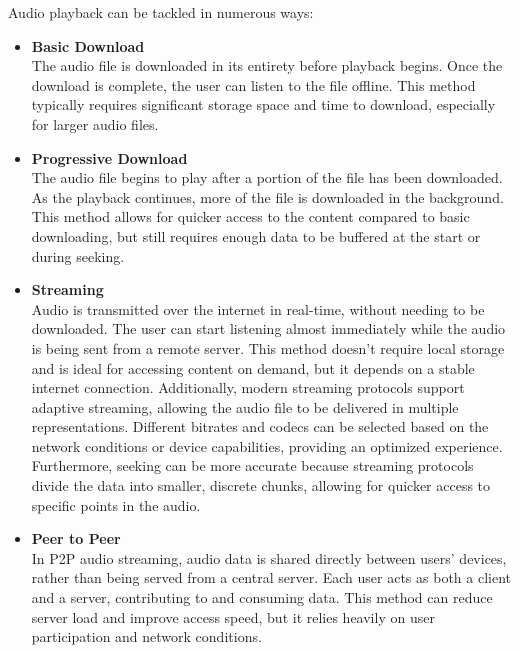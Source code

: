 Audio playback can be tackled in numerous ways:

\begin{itemize}
    \item \textbf{Basic Download}\\
    The audio file is downloaded in its entirety before playback begins.
    Once the download is complete, the user can listen to the file offline.
    This method typically requires significant storage space and time to download,
    especially for larger audio files.

    \item \textbf{Progressive Download}\\
    The audio file begins to play after a portion of the file
    has been downloaded. As the playback continues, more of the file is downloaded
    in the background. This method allows for quicker access to the content
    compared to basic downloading, but still requires enough data to be buffered at the start or during seeking.

    \item \textbf{Streaming}\\
    Audio is transmitted over the internet in real-time, without needing
    to be downloaded. The user can start listening almost immediately while the audio is being
    sent from a remote server. This method doesn’t require local storage and is
    ideal for accessing content on demand, but it depends on a stable internet connection.
    Additionally, modern streaming protocols support adaptive streaming, allowing the audio file
    to be delivered in multiple representations. Different bitrates and codecs can be
    selected based on the network conditions or device capabilities, providing an optimized experience.
    Furthermore, seeking can be more accurate because streaming protocols divide the data into
    smaller, discrete chunks, allowing for quicker access to specific points in the audio.

    \item \textbf{Peer to Peer}\\
    In P2P audio streaming, audio data is shared directly between users'
    devices, rather than being served from a central server.
    Each user acts as both a client and a server, contributing to and consuming
    data. This method can reduce server load and improve access speed,
    but it relies heavily on user participation and network conditions.
\end{itemize}

